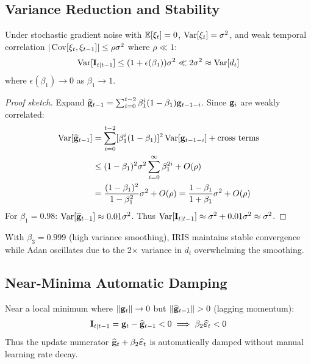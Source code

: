 \subsection{Variance Reduction and Stability}

\begin{theorem}
\label{thm:variance_reduction}
Under stochastic gradient noise with $\mathbb{E}[\xi_t] = 0$, $\operatorname{Var}[\xi_t] = \sigma^2$, and weak temporal correlation $|\operatorname{Cov}[\xi_t, \xi_{t-1}]| \leq \rho \sigma^2$ where $\rho \ll 1$:
\begin{equation}
\operatorname{Var}[\mathbf{I}_{t|t-1}] \leq (1 + \epsilon(\beta_1)) \sigma^2 \ll 2\sigma^2 \approx \operatorname{Var}[d_t]
\end{equation}
where $\epsilon(\beta_1) \to 0$ as $\beta_1 \to 1$.
\end{theorem}

\begin{proof}[Proof sketch]
Expand $\widehat{\mathbf{g}}_{t-1} = \sum_{i=0}^{t-2} \beta_1^i (1-\beta_1) \mathbf{g}_{t-1-i}$. Since $\mathbf{g}_i$ are weakly correlated:
\begin{align}
\operatorname{Var}[\widehat{\mathbf{g}}_{t-1}] &= \sum_{i=0}^{t-2} [\beta_1^i (1-\beta_1)]^2 \operatorname{Var}[\mathbf{g}_{t-1-i}] + \text{cross terms} \\
&\leq (1-\beta_1)^2 \sigma^2 \sum_{i=0}^{\infty} \beta_1^{2i} + O(\rho) \\
&= \frac{(1-\beta_1)^2}{1-\beta_1^2} \sigma^2 + O(\rho) = \frac{1-\beta_1}{1+\beta_1} \sigma^2 + O(\rho)
\end{align}
For $\beta_1 = 0.98$: $\operatorname{Var}[\widehat{\mathbf{g}}_{t-1}] \approx 0.01\sigma^2$. Thus $\operatorname{Var}[\mathbf{I}_{t|t-1}] \approx \sigma^2 + 0.01\sigma^2 \approx \sigma^2$.
\end{proof}

\begin{corollary}
With $\beta_3 = 0.999$ (high variance smoothing), IRIS maintains stable convergence while Adan oscillates due to the 2$\times$ variance in $d_t$ overwhelming the smoothing.
\end{corollary}

\subsection{Near-Minima Automatic Damping}

\begin{proposition}
\label{prop:near_minima}
Near a local minimum where $\|\mathbf{g}_t\| \to 0$ but $\|\widehat{\mathbf{g}}_{t-1}\| > 0$ (lagging momentum):
\begin{equation}
\mathbf{I}_{t|t-1} = \mathbf{g}_t - \widehat{\mathbf{g}}_{t-1} < 0 \implies \beta_2 \widehat{\bm{\varepsilon}}_t < 0
\end{equation}
Thus the update numerator $\widehat{\mathbf{g}}_t + \beta_2 \widehat{\bm{\varepsilon}}_t$ is automatically damped without manual learning rate decay.
\end{proposition}


